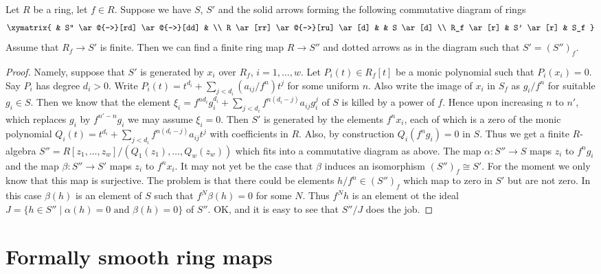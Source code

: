 \begin{lemma}
\label{lemma-finite-after-localization}
Let $R$ be a ring, let $f \in R$.
Suppose we have $S$, $S'$ and the solid arrows
forming the following commutative diagram of rings
$$
\xymatrix{
& S'' \ar@{-->}[rd] \ar@{-->}[dd] &
\\
R \ar[rr] \ar@{-->}[ru] \ar[d] &  & S \ar[d]
\\
R_f \ar[r] & S' \ar[r] & S_f
}
$$
Assume that $R_f \to S'$ is finite. Then we can find
a finite ring map $R \to S''$ and dotted arrows as
in the diagram such that $S' = (S'')_f$.
\end{lemma}

\begin{proof}
Namely, suppose that $S'$ is generated by
$x_i$ over $R_f$, $i = 1, \ldots, w$. Let $P_i(t) \in R_f[t]$
be a monic polynomial such that $P_i(x_i) = 0$.
Say $P_i$ has degree $d_i > 0$. Write
$P_i(t) = t^{d_i} + \sum_{j < d_i} (a_{ij}/f^n) t^j$
for some uniform $n$. Also write
the image of $x_i$ in $S_f$ as $g_i / f^n$
for suitable $g_i \in S$. Then we know
that the element
$\xi_i = f^{nd_i} g_i^{d_i} + \sum_{j < d_i} f^{n(d_i - j)} a_{ij} g_i^j$
of $S$ is killed by a power of $f$.
Hence upon increasing $n$ to $n'$, which replaces
$g_i$ by $f^{n' - n}g_i$ we may assume $\xi_i = 0$.
Then $S'$ is generated by the elements
$f^n x_i$, each of which is a zero of the
monic polynomial $Q_i(t) = t^{d_i} +
\sum_{j < d_i} f^{n(d_i - j)} a_{ij} t^j$
with coefficients in $R$. Also, by construction
$Q_i(f^ng_i) = 0$ in $S$. Thus we get a finite $R$-algebra
$S'' = R[z_1, \ldots, z_w]/(Q_1(z_1), \ldots, Q_w(z_w))$
which fits into a commutative diagram as above.
The map $\alpha : S'' \to S$ maps $z_i$ to $f^ng_i$ and
the map $\beta : S'' \to S'$ maps $z_i$ to $f^nx_i$.
It may not yet be the case that $\beta$ induces an
isomorphism $(S'')_f \cong S'$.
For the moment we only know that this map
is surjective. The problem is that there could be
elements $h/f^n \in (S'')_f$ which map to zero
in $S'$ but are not zero. In this case $\beta(h)$
is an element of $S$ such that $f^N \beta(h) = 0$
for some $N$. Thus $f^N h$ is an element ot the ideal
$J = \{h \in S'' \mid \alpha(h) = 0 \text{ and }
\beta(h) = 0\}$ of $S''$. OK, and it is easy to see that
$S''/J$ does the job.
\end{proof}


\section{Formally smooth ring maps}
\label{section-formally-smooth}

